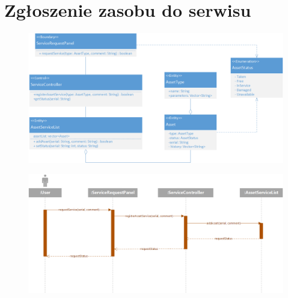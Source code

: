\documentclass[11pt, a4paper, oneside]{report}
\begin{document}
\section{Zgłoszenie zasobu do serwisu}
\begin{figure}[H]
\centering
\includegraphics[scale=0.5]{zgloszenie_serwis_class.png}
\end{figure}
\begin{figure}[H]
\centering
\includegraphics[scale=0.5]{zgloszenie_serwis_sequence.png}
\end{figure}
\end{document}
